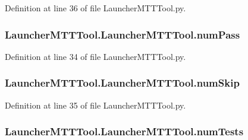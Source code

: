 Definition at line 36 of file Launcher\-M\-T\-T\-Tool.\-py.

\hypertarget{class_launcher_m_t_t_tool_1_1_launcher_m_t_t_tool_a92a3dc1fd9b7d2e9129d3a0968a871eb}{
\subsubsection[{num\-Pass}]{\setlength{\rightskip}{0pt plus 5cm}Launcher\-M\-T\-T\-Tool.\-Launcher\-M\-T\-T\-Tool.\-num\-Pass}}\label{class_launcher_m_t_t_tool_1_1_launcher_m_t_t_tool_a92a3dc1fd9b7d2e9129d3a0968a871eb}


Definition at line 34 of file Launcher\-M\-T\-T\-Tool.\-py.

\hypertarget{class_launcher_m_t_t_tool_1_1_launcher_m_t_t_tool_affd7de54ccbc2c7f78b4afa06728f5e5}{
\subsubsection[{num\-Skip}]{\setlength{\rightskip}{0pt plus 5cm}Launcher\-M\-T\-T\-Tool.\-Launcher\-M\-T\-T\-Tool.\-num\-Skip}}\label{class_launcher_m_t_t_tool_1_1_launcher_m_t_t_tool_affd7de54ccbc2c7f78b4afa06728f5e5}


Definition at line 35 of file Launcher\-M\-T\-T\-Tool.\-py.

\hypertarget{class_launcher_m_t_t_tool_1_1_launcher_m_t_t_tool_a397beae73724893629842d0031c64526}{
\subsubsection[{num\-Tests}]{\setlength{\rightskip}{0pt plus 5cm}Launcher\-M\-T\-T\-Tool.\-Launcher\-M\-T\-T\-Tool.\-num\-Tests}}\label{class_launcher_m_t_t_tool_1_1_launcher_m_t_t_tool_a397beae73724893629842d0031c64526}


